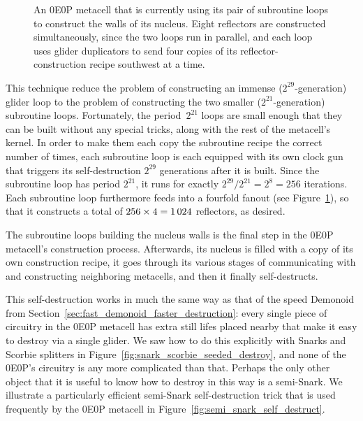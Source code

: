\begin{figure}[!htb]
	\centering
		\caption{An 0E0P metacell that is currently using its pair of subroutine loops to construct the walls of its nucleus. Eight reflectors are constructed simultaneously, since the two loops run in parallel, and each loop uses glider duplicators to send four copies of its reflector-construction recipe southwest at a time.}\label{fig:0e0p_subroutine}
\end{figure}

This technique reduce the problem of constructing an immense ($2^{29}$-generation) glider loop to the problem of constructing the two smaller ($2^{21}$-generation) subroutine loops. Fortunately, the period~$2^{21}$ loops are small enough that they can be built without any special tricks, along with the rest of the metacell's kernel. In order to make them each copy the subroutine recipe the correct number of times, each subroutine loop is each equipped with its own clock gun that triggers its self-destruction $2^{29}$ generations after it is built. Since the subroutine loop has period $2^{21}$, it runs for exactly $2^{29}/2^{21} = 2^8 = 256$ iterations. Each subroutine loop furthermore feeds into a fourfold fanout (see Figure~\ref{fig:0e0p_subroutine}), so that it constructs a total of $256 \times 4 = 1{\,}024$ reflectors, as desired.

The subroutine loops building the nucleus walls is the final step in the 0E0P metacell's construction process. Afterwards, its nucleus is filled with a copy of its own construction recipe, it goes through its various stages of communicating with and constructing neighboring metacells, and then it finally self-destructs.

This self-destruction works in much the same way as that of the speed Demonoid from Section~\ref{sec:fast_demonoid_faster_destruction}: every single piece of circuitry in the 0E0P metacell has extra still lifes placed nearby that make it easy to destroy via a single glider. We saw how to do this explicitly with Snarks and Scorbie splitters in Figure~\ref{fig:snark_scorbie_seeded_destroy}, and none of the 0E0P's circuitry is any more complicated than that. Perhaps the only other object that it is useful to know how to destroy in this way is a semi-Snark. We illustrate a particularly efficient semi-Snark self-destruction trick that is used frequently by the 0E0P metacell in Figure~\ref{fig:semi_snark_self_destruct}.

